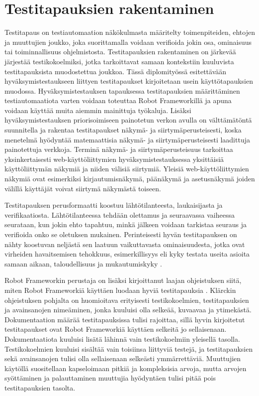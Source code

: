 \section{Testitapauksien rakentaminen} \label{ch:08_testitapauksien_rakentaminen}

  Testitapaus on testiautomaation näkökulmasta määritelty toimenpiteiden, ehtojen ja muuttujien joukko, joka suorittamalla voidaan verifioida jokin osa, ominaisuus tai toiminnallisuus ohjelmistosta.
  Testitapauksien rakentaminen on järkevää järjestää testikokoelmiksi, jotka tarkoittavat samaan kontekstiin kuuluvista testitapauksista muodostettua joukkoa.
  Tässä diplomityössä esitettävään hyväksymistestaukseen liittyen testitapaukset kirjoitetaan usein käyttötapauksien muodossa.
  Hyväksymistestauksen tapauksessa testitapauksien määrittäminen testiautomaatiota varten voidaan toteuttaa Robot Frameworkillä ja apuna voidaan käyttää muita aiemmin mainittuja työkaluja.
  Lisäksi hyväksymistestauksen priorisoimiseen painotetun verkon avulla on välttämätöntä suunnitella ja rakentaa testitapaukset näkymä- ja siirtymäperusteisesti, koska menetelmä hyödyntää matemaattisia näkymä- ja siirtymäperusteisesti laadittuja painotettuja verkkoja.
  Terminä näkymä- ja siirtymäperusteisuus tarkoittaa yksinkertaisesti web-käyttöliittymien hyväksymistestauksessa yksittäisiä käyttöliittymän näkymiä ja niiden välisiä siirtymiä.
  Yleisiä web-käyttöliittymien näkymiä ovat esimerkiksi kirjautumisnäkymä, päänäkymä ja asetusnäkymä joiden välillä käyttäjät voivat siirtymä näkymästä toiseen.

  Testitapauksen perusformaatti koostuu lähtötilanteesta, laukaisijasta ja verifikaatiosta.
  Lähtötilanteessa tehdään olettamus ja seuraavassa vaiheessa seurataan, kun jokin ehto tapahtuu, minkä jälkeen voidaan tarkistaa seuraus ja verifioida onko se oletuksen mukainen.
  Perinteisesti hyvän testitapauksen on nähty koostuvan neljästä sen laatuun vaikuttavasta ominaisuudesta, jotka ovat virheiden havaitsemisen tehokkuus, esimerkillisyys eli kyky testata useita asioita samaan aikaan, taloudellisuus ja mukautumiskyky \cite[s.~4]{software_test_automation_book}.

  Robot Frameworkin perustaja on lisäksi kirjoittanut laajan ohjeistuksen siitä, miten Robot Frameworkiä käyttäen luodaan hyviä testitapauksia \cite{robot_framework_good_test_cases}.
  Klärckin ohjeistuksen pohjalta on huomioitava erityisesti testikokoelmien, testitapauksien ja avainsanojen nimeäminen, jonka kuuluisi olla selkeää, kuvaavaa ja ytimekästä.
  Dokumentaation määrää testitapauksissa tulisi rajoittaa, sillä hyvin kirjoitetut testitapaukset ovat Robot Frameworkiä käyttäen selkeitä jo sellaisenaan.
  Dokumentaatiota kuuluisi lisätä lähinnä vain testikokoelmiin yleisellä tasolla.
  Testikokoelmien kuuluisi sisältää vain toisiinsa liittyviä testejä, ja testitapauksien sekä avainsanojen tulisi olla sellaisenaan selkeästi ymmärrettäviä.
  Muuttujien käytöllä suositellaan kapseloimaan pitkiä ja kompleksisia arvoja, mutta arvojen syöttäminen ja palauttaminen muuttujia hyödyntäen tulisi pitää pois testitapauksien tasolta.

